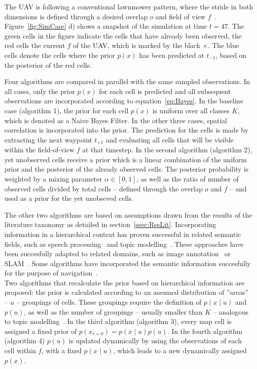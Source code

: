 \documentclass[twocolumn,letterpaper]{IEEEAerospaceCLS}  %
\begin{document}
The UAV is following a conventional lawnmower pattern, where the stride in both dimensions is defined through a desired overlap $o$ and field of view $f$~\cite{shetty_implementation_2020}. Figure~\ref{fig:SimCase} d) shows a snapshot of the simulation at time $t=47$. The green cells in the figure indicate the cells that have already been observed, the red cells the current $f$ of the UAV, which is marked by the black $\pmb{\times}$. The blue cells denote the cells where the prior $p(x)$ has been predicted at $t_{-1}$, based on the posterior of the red cells.

Four algorithms are compared in parallel with the same sampled observations. In all cases, only the prior $p(x)$ for each cell is predicted and all subsequent observations are incorporated according to equation~\ref{eq:Bayes}. In the baseline case (algorithm 1), the prior for each cell $p(x)$ is uniform over all classes $K$, which is denoted as a Naive Bayes Filter. In the other three cases, spatial correlation is incorporated into the prior. The prediction for the cells is made by extracting the next waypoint $t_{+1}$ and evaluating all cells that will be visible within the field-of-view $f$ at that timestep. In the second algorithm (algorithm 2), yet unobserved cells receive a prior which is a linear combination of the uniform prior and the posterior of the already observed cells. The posterior probability is weighted by a mixing parameter $\alpha \in [0, 1]$, as well as the ratio of number of observed cells divided by total cells -- defined through the overlap $o$ and $f$ -- and used as a prior for the yet unobseved cells.

The other two algorithms are based on assumptions drawn from the results of the literature taxonomy as detailed in section~\ref{ssec:ResLit}. Incorporating information in a hierarchical context has proven successful in related semantic fields, such as speech processing~\cite{fine_hierarchical_1998} and topic modelling~\cite{blei_latent_2003}. These approaches have been succesfully adapted to related domains, such as image annotation~\cite{fei-fei_bayesian_2005,lienou_semantic_2010} or SLAM~\cite{zhang_hierarchical_2019}. Some algorithms have incorporated the semantic information succesfully for the purpose of navigation~\cite{koch_automatic_2019,chaplot_object_2020,wu_learning_2018,alirezaie_exploiting_2017}.\\
Two algorithms  that recalculate the prior based on hierarchical information are proposed: the prior is calculated according to an assumed distribution of ''areas'' -- $u$ -- groupings of cells. These groupings require the definition of $p(x\mid u)$ and $p(u)$, as well as the number of groupings -- usually smaller than $K$ -- analogous to topic modelling~\cite{blei_latent_2003}. In the third algorithm (algorithm 3), every map cell is assigned a fixed prior of $p(x_{t=0}) = p(x\mid u) p(u)$. In the fourth algorithm (algorithm 4) $p(u)$ is updated dynamically by using the observations of each cell within $f$, with a fixed $p(x\mid u)$, which leads to a new dynamically assigned $p(x)$.
\end{document}
